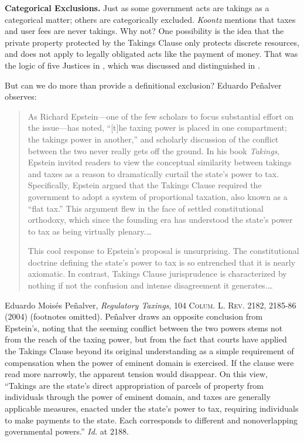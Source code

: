 \item \textbf{Categorical Exclusions.} Just as some government acts are takings
as a categorical matter; others are categorically excluded. \textit{Koontz}
mentions that taxes and user fees are never takings. Why not? One possibility is
the idea that the private property protected by the Takings Clause only protects
discrete resources, and does not apply to legally obligated acts like the
payment of money. That was the logic of five Justices in
, which was discussed and distinguished in
.

But can we do more than provide a definitional exclusion? Eduardo Pe\~nalver
observes: 
\begin{quotation}
As Richard Epstein---one of the few scholars to focus substantial effort on the
issue---has noted, ``[t]he taxing power is placed in one compartment; the
takings power in another,'' and scholarly discussion of the conflict between the
two never really gets off the ground. In his book \textit{Takings}, Epstein
invited readers to view the conceptual similarity between takings and taxes as a
reason to dramatically curtail the state's power to tax. Specifically, Epstein
argued that the Takings Clause required the government to adopt a system of
proportional taxation, also known as a ``flat tax.'' This argument flew in the
face of settled constitutional orthodoxy, which since the founding era has
understood the state's power to tax as being virtually plenary.\ldots 

This cool response to Epstein's proposal is unsurprising. The constitutional
doctrine defining the state's power to tax is so entrenched that it is nearly
axiomatic. In contrast, Takings Clause jurisprudence is characterized by nothing
if not the confusion and intense disagreement it generates.\ldots
\end{quotation}
Eduardo Mois\'es Pe\~nalver, \textit{Regulatory Taxings}, 104 \textsc{Colum. L.
Rev}. 2182, 2185-86 (2004) (footnotes omitted). Pe\~nalver draws an opposite
conclusion from Epstein's, noting that the seeming conflict between the two
powers stems not from the reach of the taxing power, but from the fact that
courts have applied the Takings Clause beyond its original understanding as a
simple requirement of compensation when the power of eminent domain is
exercised. If the clause were read more narrowly, the apparent tension would
disappear. On this view, ``Takings are the state's direct appropriation of
parcels of property from individuals through the power of eminent domain, and
taxes are generally applicable measures, enacted under the state's power to tax,
requiring individuals to make payments to the state. Each corresponds to
different and nonoverlapping governmental powers.'' \textit{Id.} at 2188.

